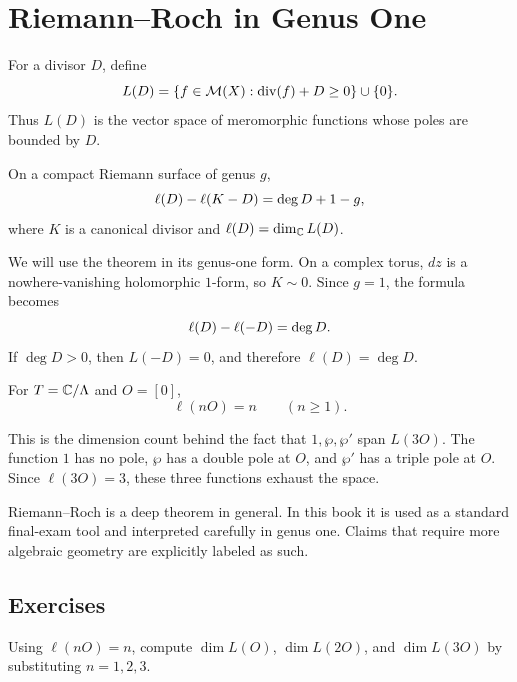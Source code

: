 \chapter{Riemann--Roch in Genus One}
\label{ch:riemann-roch}

For a divisor \(D\), define
\[
  L(D)=\{f\in\mathcal{M}(X): \operatorname{div}(f)+D\ge 0\}\cup\{0\}.
\]
Thus \(L(D)\) is the vector space of meromorphic functions whose poles are bounded
by \(D\).

\begin{theorem}
\label{thm:rr}
On a compact Riemann surface of genus \(g\),
\[
  \ell(D)-\ell(K-D)=\operatorname{deg} D+1-g,
\]
where \(K\) is a canonical divisor and \(\ell(D)=\dim_{\mathbb{C}} L(D)\).
\end{theorem}

We will use the theorem in its genus-one form.  On a complex torus, \(dz\) is a
nowhere-vanishing holomorphic \(1\)-form, so \(K\sim0\).  Since \(g=1\), the
formula becomes
\[
  \ell(D)-\ell(-D)=\operatorname{deg} D.
\]
If \(\deg D>0\), then \(L(-D)=0\), and therefore \(\ell(D)=\deg D\).

\begin{corollary}
\label{cor:ell-nO}
For \(T=\mathbb{C}/\Lambda\) and \(O=[0]\),
\[
  \ell(nO)=n\qquad(n\ge 1).
\]
\end{corollary}

This is the dimension count behind the fact that \(1,\wp,\wp'\) span \(L(3O)\).
The function \(1\) has no pole, \(\wp\) has a
double pole at \(O\), and \(\wp'\) has a triple pole at \(O\).  Since
\(\ell(3O)=3\), these three functions exhaust the space.

\begin{warning}
Riemann--Roch is a deep theorem in general.  In this book it is used as a
standard final-exam tool and interpreted carefully in genus one.  Claims that
require more algebraic geometry are explicitly labeled as such.
\end{warning}

\section*{Exercises}

\begin{exercise}
Using \(\ell(nO)=n\), compute \(\dim L(O)\), \(\dim L(2O)\), and
\(\dim L(3O)\) by substituting \(n=1,2,3\).
\end{exercise}

